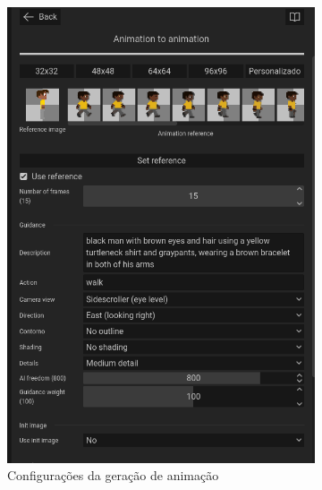 \begin{figure}[htbp]
    \centering
    \caption{\small Processo da utilização 3 da ferramenta de animação do PixelLab em julho/2025}
    \label{fig:pixelLabAnimacao3}

    \begin{subfigure}{0.6\linewidth}
        \includegraphics[width=1\linewidth]{figs/pixelLab/dia3/tela_4.PNG}
        \caption{\small Configurações da geração de animação}
        \label{fig:pixelLabAnimacao3a}
    \end{subfigure}
    \begin{subfigure}{0.35\linewidth}

\end{subfigure}
\end{figure}
